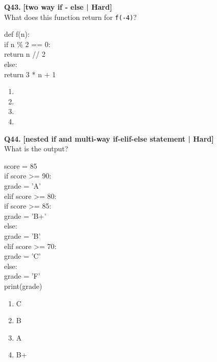 \noindent\textbf{Q43.} \hfill {\small\color{LPUOrange}\textbf{[two way if - else | Hard]}}\\[2pt]
What does this function return for \texttt{f(-4)}? 

\begin{pycode}
def f(n):\\
if n \% 2 == 0:\\
return n // 2\\
else:\\
return 3 * n + 1
\end{pycode}

\begin{enumerate}[label=(\alph*),topsep=2pt,itemsep=1pt,partopsep=0pt,parsep=0pt]
    \item {}
    \item {}
    \item {}
    \item {}
\end{enumerate}
\vspace{2mm}

\noindent\textbf{Q44.} \hfill {\small\color{LPUOrange}\textbf{[nested if and multi-way if-elif-else statement | Hard]}}\\[2pt]
What is the output? 

\begin{pycode}
score = 85\\
if score >= 90:\\
grade = 'A'\\
elif score >= 80:\\
if score >= 85:\\
grade = 'B+'\\
else:\\
grade = 'B'\\
elif score >= 70:\\
grade = 'C'\\
else:\\
grade = 'F'\\
print(grade)
\end{pycode}

\begin{enumerate}[label=(\alph*),topsep=2pt,itemsep=1pt,partopsep=0pt,parsep=0pt]
    \item \relax C
    \item \relax B
    \item \relax A
    \item \relax B+
\end{enumerate}
\vspace{2mm}

